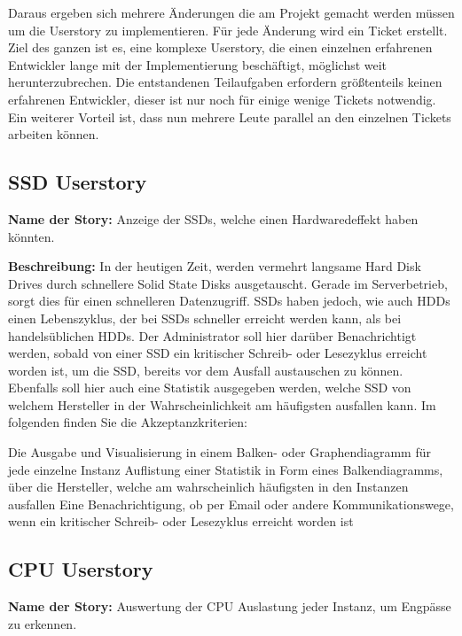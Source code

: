 Daraus ergeben sich mehrere Änderungen die am Projekt gemacht werden müssen um
die Userstory zu implementieren. Für jede Änderung wird ein Ticket erstellt.
Ziel des ganzen ist es, eine komplexe Userstory, die einen einzelnen
erfahrenen Entwickler lange mit der Implementierung beschäftigt, möglichst weit
herunterzubrechen. Die entstandenen Teilaufgaben erfordern größtenteils keinen
erfahrenen Entwickler, dieser ist nur noch für einige wenige Tickets notwendig.
Ein weiterer Vorteil ist, dass nun mehrere Leute parallel an den einzelnen
Tickets arbeiten können.
\tm%

\subsection{SSD Userstory}
\textbf{Name der Story:} Anzeige der SSDs, welche einen Hardwaredeffekt haben
könnten.

\textbf{Beschreibung:} In der heutigen Zeit, werden vermehrt langsame
Hard Disk Drives durch schnellere Solid State Disks ausgetauscht. Gerade im
Serverbetrieb, sorgt dies für einen schnelleren Datenzugriff. SSDs haben
jedoch, wie auch HDDs einen Lebenszyklus, der bei SSDs schneller erreicht
werden kann, als bei handelsüblichen HDDs. Der Administrator soll hier darüber
Benachrichtigt werden, sobald von einer SSD ein kritischer Schreib- oder
Lesezyklus erreicht worden ist, um die SSD, bereits vor dem Ausfall austauschen
zu können. Ebenfalls soll hier auch eine Statistik ausgegeben werden, welche
SSD von welchem Hersteller in der Wahrscheinlichkeit am häufigsten ausfallen
kann. Im folgenden finden Sie die Akzeptanzkriterien:

\begin{outline}
  \1 Die Ausgabe und Visualisierung in einem Balken- oder Graphendiagramm
  für jede einzelne Instanz
  \1 Auflistung einer Statistik in Form eines Balkendiagramms, über die
  Hersteller, welche am wahrscheinlich häufigsten in den Instanzen ausfallen
  \1 Eine Benachrichtigung, ob per Email oder andere Kommunikationswege,
  wenn ein kritischer Schreib- oder Lesezyklus erreicht worden ist
\end{outline}
\mr%

\subsection{CPU Userstory}
\textbf{Name der Story:} Auswertung der CPU Auslastung jeder Instanz, um
Engpässe zu erkennen.

